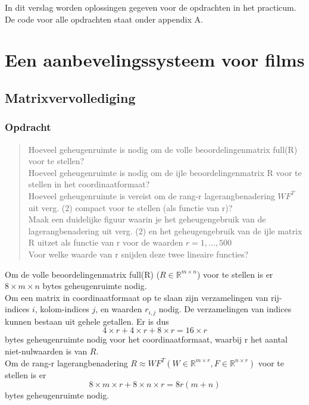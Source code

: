 \documentclass[11pt, a4paper, titlepage, openright]{article}
\begin{document}

\tableofcontents
\newpage

In dit verslag worden oplossingen gegeven voor de opdrachten in het practicum.
De code voor alle opdrachten staat onder appendix A.

\section{Een aanbevelingssysteem voor films}
	\subsection{Matrixvervollediging}

	\subsubsection{Opdracht }
	\begin{quote}
        Hoeveel geheugenruimte is nodig om de volle beoordelingenmatrix full(R) voor te stellen? \\
        Hoeveel geheugenruimte is nodig om de ijle beoordelingenmatrix R voor te stellen in het coordinaatformaat? \\
        Hoeveel geheugenruimte is vereist om de rang-r lagerangbenadering \( W F^T \) uit verg. (2) compact voor te stellen (als functie van r)? \\
        Maak een duidelijke figuur waarin je het geheugengebruik van de lagerangbenadering uit verg. (2) en het
        geheugengebruik van de ijle matrix R uitzet als functie van r voor de waarden \( r = 1, ..., 500 \) \\
        Voor welke waarde van r snijden deze twee lineaire functies?
	\end{quote}

    Om de volle beoordelingenmatrix full(R) (\( R \in \mathbb{R}^{m \times n} \)) voor te stellen
    is er \( 8 \times m \times n \) bytes geheugenruimte nodig. \\

    Om een matrix in coordinaatformaat op te slaan zijn verzamelingen van rij-indices \(i\),
    kolom-indices \(j\), en waarden \( r_{i,j} \) nodig. De verzamelingen van indices kunnen bestaan
    uit gehele getallen. Er is dus \[ 4 \times r + 4 \times r + 8 \times r = 16 \times r \] bytes
    geheugenruimte nodig voor het coordinaatformaat, waarbij r het aantal niet-nulwaarden is van \( R\). \\

    Om de rang-r lagerangbenadering \( R \approx WF^T (W \in \mathbb{R}^{m \times r}, F \in \mathbb{R}^{n \times r} ) \)
    voor te stellen is er  \[ 8 \times m \times r + 8 \times n \times r = 8r (m + n) \]  bytes geheugenruimte nodig.
\end{document}
